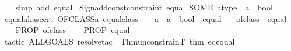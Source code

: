 \begin{isabellebody}
%
\isadelimproof
\ \ %
\endisadelimproof
%
\isatagproof
{}\isamarkupfalse%
\ {\isacharparenleft}{\kern0pt}simp\ add{\isacharcolon}{\kern0pt}\ equal{\isacharparenright}{\kern0pt}%
\endisatagproof
{\isafoldproof}%
%
\isadelimproof
\isanewline
%
\endisadelimproof
%
\isadelimML
\isanewline
%
\endisadelimML
%
\isatagML
{}\isamarkupfalse%
\ {\isacartoucheopen}Sign{\isachardot}{\kern0pt}add{\isacharunderscore}{\kern0pt}const{\isacharunderscore}{\kern0pt}constraint\ {\isacharparenleft}{\kern0pt}\isactrlconstUNDERSCOREname {\isasymopen}equal{\isasymclose}{\isacharcomma}{\kern0pt}\ SOME\ \isactrltyp {\isasymopen}{\isacharprime}{\kern0pt}a{\isacharcolon}{\kern0pt}{\isacharcolon}{\kern0pt}type\ {\isasymRightarrow}\ {\isacharprime}{\kern0pt}a\ {\isasymRightarrow}\ bool{\isasymclose}{\isacharparenright}{\kern0pt}{\isacartoucheclose}%
\endisatagML
{\isafoldML}%
%
\isadelimML
\isanewline
%
\endisadelimML
\isanewline
{}\isamarkupfalse%
\ equal{\isacharunderscore}{\kern0pt}alias{\isacharunderscore}{\kern0pt}cert{\isacharcolon}{\kern0pt}\ {\isachardoublequoteopen}OFCLASS{\isacharparenleft}{\kern0pt}{\isacharprime}{\kern0pt}a{\isacharcomma}{\kern0pt}\ equal{\isacharunderscore}{\kern0pt}class{\isacharparenright}{\kern0pt}\ {\isasymequiv}\ {\isacharparenleft}{\kern0pt}{\isacharparenleft}{\kern0pt}{\isacharparenleft}{\kern0pt}{\isacharequal}{\kern0pt}{\isacharparenright}{\kern0pt}\ {\isacharcolon}{\kern0pt}{\isacharcolon}{\kern0pt}\ {\isacharprime}{\kern0pt}a\ {\isasymRightarrow}\ {\isacharprime}{\kern0pt}a\ {\isasymRightarrow}\ bool{\isacharparenright}{\kern0pt}\ {\isasymequiv}\ equal{\isacharparenright}{\kern0pt}{\isachardoublequoteclose}\isanewline
\ \ {\isacharparenleft}{\kern0pt}\ {\isachardoublequoteopen}{\isacharquery}{\kern0pt}ofclass\ {\isasymequiv}\ {\isacharquery}{\kern0pt}equal{\isachardoublequoteclose}{\isacharparenright}{\kern0pt}\isanewline
%
\isadelimproof
%
\endisadelimproof
%
\isatagproof
{}\isamarkupfalse%
\isanewline
\ \ \isamarkupfalse%
\ {\isachardoublequoteopen}PROP\ {\isacharquery}{\kern0pt}ofclass{\isachardoublequoteclose}\isanewline
\ \ \isamarkupfalse%
\ {\isachardoublequoteopen}PROP\ {\isacharquery}{\kern0pt}equal{\isachardoublequoteclose}\isanewline
\ \ \ \ \isamarkupfalse%
\ {\isacharparenleft}{\kern0pt}tactic\ {\isacartoucheopen}ALLGOALS\ {\isacharparenleft}{\kern0pt}resolve{\isacharunderscore}{\kern0pt}tac\ \isactrlcontext \ {\isacharbrackleft}{\kern0pt}Thm{\isachardot}{\kern0pt}unconstrainT\ {\isacharat}{\kern0pt}{\isacharbraceleft}{\kern0pt}thm\ eq{\isacharunderscore}{\kern0pt}equal{\isacharbraceright}{\kern0pt}{\isacharbrackright}{\kern0pt}{\isacharparenright}{\kern0pt}{\isacartoucheclose}{\isacharparenright}{\kern0pt}\isanewline

\end{isabellebody}
